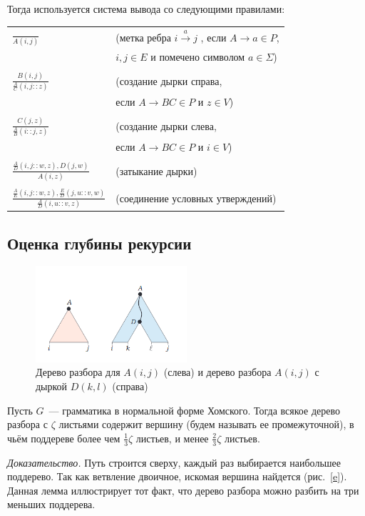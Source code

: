 Тогда используется система вывода со следующими правилами:
\begin{table}[ht]
  \centering
  \begin{tabular}[t]{l l}
   $\frac{}{A(i , j)}$ &(метка ребра $i \xrightarrow a j$ , если $A \rightarrow a \in P$,
   \\ &   $i , j \in E$ и помечено символом $a \in \Sigma$)\\
    & \\
   $\frac{B(i , j)}{\frac{A}{C}(i , j :: z)}$  & (создание дырки справа, 
    \\ & если  $A \rightarrow BC \in P$ и $z \in V$) \\
   & \\
   $\frac{C(j  , z)}{\frac{A}{B}(i :: j  , z)}$  & (создание дырки слева, 
   \\ & если  $A \rightarrow BC \in P$ и $i \in V$) \\
   &\\
   $\frac{\frac{A}{D}(i , j :: w , z), D(j , w)}{A(i  , z)}$  & (затыкание дырки) \\
   &\\
   $\frac{\frac{A}{E}(i , j :: w  , z), \frac{E}{D}( j , u :: v , w)}{\frac{A}{D}(i, u :: v , z)}$  & (соединение условных утверждений) \\
\end{tabular}
\end{table}
\subsection {Оценка глубины рекурсии}
\begin{figure}[!]
\centering
\includegraphics[width=0.5\textwidth]{Shemetova/trees.png}
\caption{Дерево разбора для $A(i, j)$ (слева) и дерево разбора $A(i, j)$ с дыркой $D(k, l)$ (справа)}
\label{hole}
\end{figure}
\begin{lemmarus}\label{TreeLem}
Пусть $G$~--- грамматика в нормальной форме Хомского. Тогда всякое дерево разбора с $\zeta$ листьями содержит вершину (будем называть ее промежуточной), в чьём поддереве более чем $\frac{1}{3}\zeta$ листьев, и менее $\frac{2}{3}\zeta$ листьев.
\end{lemmarus}
\textit{Доказательство.} Путь строится сверху, каждый раз выбирается наибольшее поддерево. Так как ветвление двоичное, искомая вершина найдется (рис.~\ref{e}). Данная лемма иллюстрирует тот факт, что дерево разбора можно разбить на три меньших поддерева.


